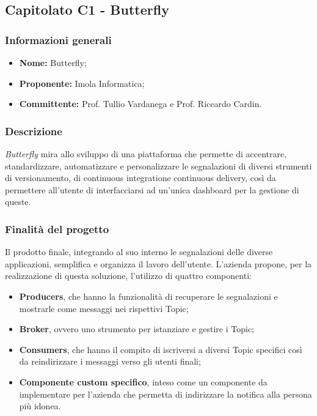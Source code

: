 \subsection{Capitolato C1 - Butterfly}
\subsubsection{Informazioni generali}
\begin{itemize}
\item
\textbf{Nome:} Butterfly;
\item
\textbf{Proponente:} Imola Informatica;
\item
\textbf{Committente:} Prof. Tullio Vardanega e Prof. Riccardo Cardin.
\end{itemize}
\subsubsection{Descrizione}
\textit{Butterfly} mira allo sviluppo di una piattaforma che permette di
 accentrare, standardizzare, automatizzare e personalizzare le segnalazioni di
 diversi strumenti di versionamento, di continuous integration\glosp e continuous delivery\glo , così da permettere all'utente di interfacciarsi ad un'unica dashboard per la gestione di queste.
\subsubsection{Finalità del progetto}
Il prodotto finale, integrando al suo interno le segnalazioni delle diverse 
applicazioni, semplifica e organizza il lavoro dell'utente. L'azienda propone,
per la realizzazione di questa soluzione, l'utilizzo di quattro componenti:
\begin{itemize}
	\item \textbf{Producers}, che hanno la funzionalità di recuperare le
	segnalazioni e mostrarle come messaggi nei rispettivi Topic;
	\item \textbf{Broker}, ovvero uno strumento per istanziare e gestire i
	 Topic;
	\item \textbf{Consumers}, che hanno il compito di iscriversi a diversi
	Topic specifici così da reindirizzare i messaggi verso gli utenti finali;
    \item \textbf{Componente custom specifico}, inteso come un componente da
    implementare per l'azienda che permetta di indirizzare la notifica alla
    persona più idonea.
\end{itemize}
